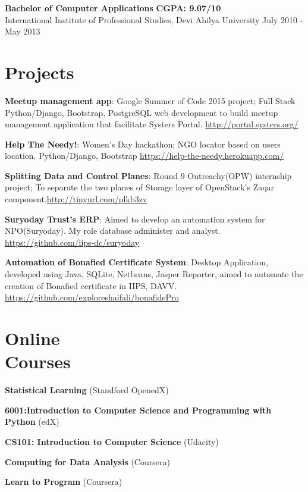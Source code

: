 \documentclass[margin,line]{resume}
\begin{document}
\begin{resume}
	\begin{list2}
	\item \textbf{Bachelor of Computer Applications} \hspace{70mm} \textbf{CGPA: 9.07/10} \\ International Institute of Professional Studies, Devi Ahilya University \hspace{20mm} July 2010 - May 2013
	\end{list2}

    \section{\mysidestyle Projects} 
	\begin{list2}

    \item \textbf{Meetup management app}: Google Summer of Code 2015 project; Full Stack Python/Django, Bootstrap, PostgreSQL web development to build meetup management application that facilitate Systers Portal. \url{http://portal.systers.org/}	
    \item \textbf{Help The Needy!}: Women's Day hackathon; NGO locator based on users location. Python/Django, Bootstrap \url{https://help-the-needy.herokuapp.com/}
    \item \textbf{Splitting Data and Control Planes}: Round 9 Outreachy(OPW) internship project; To separate the two planes of Storage layer of OpenStack's Zaqar component.\url{http://tinyurl.com/plkb3zv}
	\item \textbf{Suryoday Trust's ERP}: Aimed to develop an automation system for NPO(Suryoday). My role
    database administer and analyst. \url{https://github.com/iips-dc/suryoday}
	\item \textbf{Automation of Bonafied Certificate System}: Desktop Application, developed using Java,
    SQLite, Netbeans, Jasper Reporter, aimed to automate the creation of Bonafied certificate in IIPS, DAVV. \url{https://github.com/exploreshaifali/bonafidePro}
    \end{list2}

    \section{\mysidestyle Online \\ Courses}

    \begin{list2}
	\item \textbf{Statistical Learning} (Standford OpenedX)
	\item \textbf{6001:Introduction to Computer Science and Programming with Python} (edX)
	\item \textbf{CS101: Introduction to Computer Science} (Udacity)
	\item \textbf{Computing for Data Analysis} (Coursera)
    \item \textbf{Learn to Program} (Coursera)
	\end{list2}


\end{resume}
\end{document}
